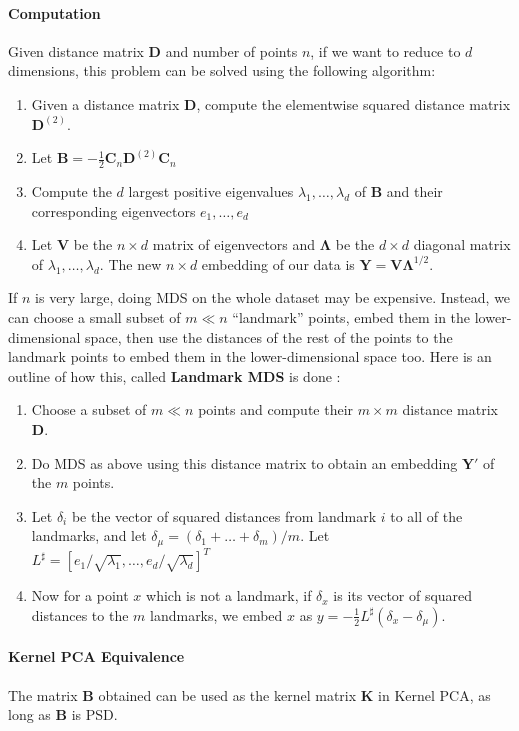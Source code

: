 \documentclass[12pt,a4paper]{article}
\newcommand{\1}[1]{\mathds{1}\left[#1\right]}
\newcommand{\B}[1]{\mathbf{#1}}
\begin{document}
\paragraph{Computation} Given distance matrix $\B D$ and number of points $n$, if we want to reduce to $d$ dimensions, this problem can be solved using the following algorithm:\cite{mdsintro}
\begin{enumerate}
    \item Given a distance matrix $\B D$, compute the elementwise squared distance matrix $\B D^{(2)}$.
    \item Let  $\B B=-\frac{1}{2} \B C_n \B D^{(2)} \B C_n$
    \item Compute the $d$ largest positive eigenvalues $\lambda_1,\ldots,\lambda_d$ of $\B B$ and their corresponding eigenvectors $ e_1,\ldots, e_d$
    \item Let $\B V$ be the $n\times d$ matrix of eigenvectors and $\B \Lambda$ be the $d\times d$ diagonal matrix of $\lambda_1,\ldots,\lambda_d$. The new $n\times d$ embedding of our data is $\B Y=\B V\boldsymbol\Lambda^{1/2}$.
\end{enumerate}

\noindent If $n$ is very large, doing MDS on the whole dataset may be expensive. Instead, we can choose a small subset of $m\ll n$ ``landmark'' points, embed them in the lower-dimensional space, then use the distances of the rest of the points to the landmark points to embed them in the lower-dimensional space too. Here is an outline of how this, called \textbf{Landmark MDS} is done \cite{landmarkmds}:

\begin{enumerate}
    \item Choose a subset of $m\ll n$ points and compute their $m\times m$ distance matrix $\B D$.
    \item Do MDS as above using this distance matrix to obtain an embedding $\B Y'$ of the $m$ points.
    \item Let $\delta_i$ be the vector of squared distances from landmark $i$ to all of the landmarks, and let $\delta_\mu=(\delta_1+\ldots+\delta_m)/m$. Let $L^\sharp=[e_1/\sqrt{\lambda_1},\ldots,e_d/\sqrt{\lambda_d}]^T$
    \item Now for a point $x$ which is not a landmark, if $\delta_x$ is its vector of squared distances to the $m$ landmarks, we embed $x$ as $y=-\frac{1}{2}L^\sharp (\delta_x-\delta_\mu)$. 
\end{enumerate}

\paragraph{Kernel PCA Equivalence} The matrix $\B B$ obtained can be used as the kernel matrix $\B K$ in Kernel PCA, as long as $\B B$ is PSD. \cite{fml}
\end{document}
